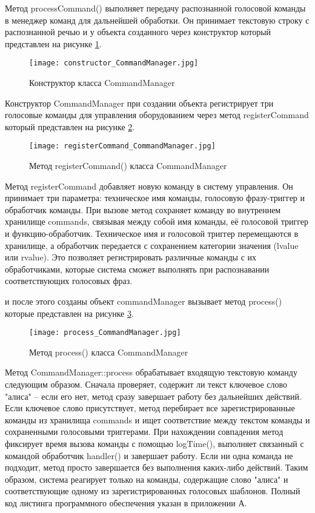 Метод processCommand() выполняет передачу распознанной голосовой команды в менеджер команд для дальнейшей обработки. Он принимает текстовую строку с распознанной речью и у объекта созданного через конструктор который представлен на рисунке \ref{fig:constructor_CommandManager}.


\begin{figure}[H]
	\centering
	\texttt{[image: constructor\_CommandManager.jpg]}
	\caption{Конструктор класса CommandManager}
	\label{fig:constructor_CommandManager}
\end{figure}

Конструктор CommandManager при создании объекта регистрирует три голосовые команды для управления оборудованием через метод registerCommand который представлен на рисунке \ref{fig:registerCommand_CommandManager}.

\begin{figure}[H]
	\centering
	\texttt{[image: registerCommand\_CommandManager.jpg]}
	\caption{Метод registerCommand()  класса CommandManager}
	\label{fig:registerCommand_CommandManager}
\end{figure}

Метод registerCommand добавляет новую команду в систему управления. Он принимает три параметра: техническое имя команды, голосовую фразу-триггер и обработчик команды. При вызове метод сохраняет команду во внутреннем хранилище commands, связывая между собой имя команды, её голосовой триггер и функцию-обработчик. Техническое имя и голосовой триггер перемещаются в хранилище, а обработчик передается с сохранением категории значения (lvalue или rvalue). Это позволяет регистрировать различные команды с их обработчиками, которые система сможет выполнять при распознавании соответствующих голосовых фраз.

 и после этого созданы объект commandManager вызывает метод process() которые представлен на рисунке \ref{fig:process_CommandManager}.

\begin{figure}[H]
	\centering
	\texttt{[image: process\_CommandManager.jpg]}
	\caption{Метод process()  класса CommandManager}
	\label{fig:process_CommandManager}
\end{figure}

Метод CommandManager::process обрабатывает входящую текстовую команду следующим образом. Сначала проверяет, содержит ли текст ключевое слово "алиса" -- если его нет, метод сразу завершает работу без дальнейших действий. Если ключевое слово присутствует, метод перебирает все зарегистрированные команды из хранилища commands и ищет соответствие между текстом команды и сохраненными голосовыми триггерами. При нахождении совпадения метод фиксирует время вызова команды с помощью logTime(), выполняет связанный с командой обработчик handler() и завершает работу. Если ни одна команда не подходит, метод просто завершается без выполнения каких-либо действий. Таким образом, система реагирует только на команды, содержащие слово "алиса" и соответствующие одному из зарегистрированных голосовых шаблонов. Полный код листинга программного обеспечения указан в приложении А.

\newpage
